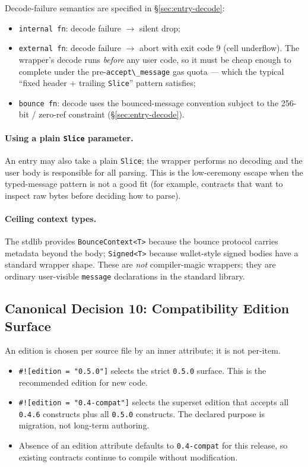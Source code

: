 \documentclass[12pt,oneside]{article}
\begin{document}
Decode-failure semantics are specified in \S\ref{sec:entry-decode}:

\begin{itemize}
\item \verb|internal fn|: decode failure $\to$ silent drop;
\item \verb|external fn|: decode failure $\to$ abort with exit code 9
(cell underflow). The wrapper's decode runs \emph{before} any user
code, so it must be cheap enough to complete under the
pre-\verb|accept\_message| gas quota --- which the typical ``fixed
header + trailing \verb|Slice|'' pattern satisfies;
\item \verb|bounce fn|: decode uses the bounced-message convention
subject to the 256-bit / zero-ref constraint
(\S\ref{sec:entry-decode}).
\end{itemize}

\paragraph{Using a plain \texttt{Slice} parameter.}
An entry may also take a plain \verb|Slice|; the wrapper performs no
decoding and the user body is responsible for all parsing. This is
the low-ceremony escape when the typed-message pattern is not a good
fit (for example, contracts that want to inspect raw bytes before
deciding how to parse).

\paragraph{Ceiling context types.}
The stdlib provides \verb|BounceContext<T>| because the bounce
protocol carries metadata beyond the body; \verb|Signed<T>| because
wallet-style signed bodies have a standard wrapper shape. These are
\emph{not} compiler-magic wrappers; they are ordinary user-visible
\verb|message| declarations in the standard library.

\subsection{Canonical Decision 10: Compatibility Edition Surface}
\label{sec:cd-compat}
An edition is chosen per source file by an inner attribute; it is not
per-item.

\begin{itemize}
\item \verb|#![edition = "0.5.0"]| selects the strict \verb|0.5.0| surface.
This is the recommended edition for new code.
\item \verb|#![edition = "0.4-compat"]| selects the superset edition that
accepts all \verb|0.4.6| constructs plus all \verb|0.5.0| constructs.
The declared purpose is migration, not long-term authoring.
\item Absence of an edition attribute defaults to \verb|0.4-compat| for
this release, so existing contracts continue to compile without
modification.
\end{itemize}
\end{document}
